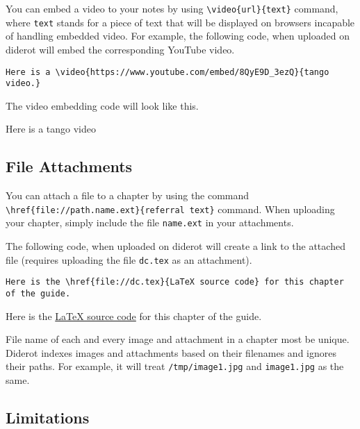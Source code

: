 You can embed a video to your notes by using \lstinline`\video{url}{text}` command, where \lstinline`text` stands for a piece of text that will be displayed on browsers incapable of handling embedded video.
%
For example, the following code, when uploaded on diderot will embed the corresponding YouTube video.
%
\begin{lstlisting}
Here is a \video{https://www.youtube.com/embed/8QyE9D_3ezQ}{tango video.}
\end{lstlisting}

\begin{example}
The video embedding code will look like this.

Here is a tango video 
%

\end{example}

\subsection{File Attachments}

You can attach a file to a chapter by using the command \lstinline`\href{file://path.name.ext}{referral text}` command.
%
When uploading your chapter, simply include the file \lstinline{name.ext} in your attachments.
%


\begin{example}
The following code, when uploaded on diderot will create a link to the attached file (requires uploading the file \lstinline`dc.tex` as an attachment).  
%
\begin{lstlisting}
Here is the \href{file://dc.tex}{LaTeX source code} for this chapter of the guide.
\end{lstlisting}

Here is the \href{file://dc.tex}{LaTeX source code} for this chapter of the guide.
\end{example}


\begin{important}
File name of each and every image and attachment in a chapter most be unique.
%
Diderot indexes images and attachments based on their filenames and ignores their paths.
%
For example, it will treat
%
\lstinline`/tmp/image1.jpg` and  \lstinline`image1.jpg` 
%
as the same.

\end{important}

\subsection{Limitations}
\label{sec:mtl::limitations}

